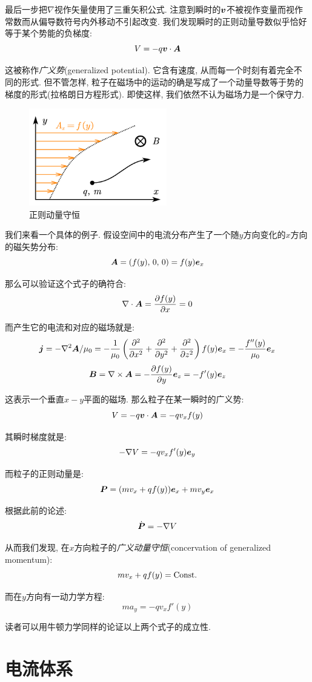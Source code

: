 最后一步把$\nabla$视作矢量使用了三重矢积公式. 注意到瞬时的$\boldsymbol{v}$不被视作变量而视作常数而从偏导数符号内外移动不引起改变. 我们发现瞬时的正则动量导数似乎恰好等于某个势能的负梯度:
\[V=-q\boldsymbol{v}\cdot\boldsymbol{A}\]

这被称作\emph{广义势}(generalized potential). 它含有速度, 从而每一个时刻有着完全不同的形式. 但不管怎样, 粒子在磁场中的运动的确是写成了一个动量导数等于势的梯度的形式(拉格朗日方程形式). 即使这样, 我们依然不认为磁场力是一个保守力.

\begin{figure}
\centering
\includegraphics[width=6cm]{image/7-4-9.png}
\caption{正则动量守恒}
\end{figure}
我们来看一个具体的例子. 假设空间中的电流分布产生了一个随$y$方向变化的$x$方向的磁矢势分布:
\[\boldsymbol{A}=(f(y),\,0,\,0)=f(y)\boldsymbol{e}_x\]

那么可以验证这个式子的确符合:
\[\nabla\cdot\boldsymbol{A}=\frac{\partial f(y)}{\partial x}=0\]

而产生它的电流和对应的磁场就是:
\[\boldsymbol{j}=-\nabla^2\boldsymbol{A}/\mu_0=-\frac{1}{\mu_0}\left(\frac{\partial^2}{\partial x^2}+\frac{\partial^2}{\partial y^2}+\frac{\partial^2}{\partial z^2}\right)f(y)\boldsymbol{e}_x=-\frac{f''(y)}{\mu_0}\boldsymbol{e}_x\]
\[\boldsymbol{B}=\nabla\times \boldsymbol{A}=-\frac{\partial f(y)}{\partial y}\boldsymbol{e}_z=-f'(y)\boldsymbol{e}_z\]

这表示一个垂直$x-y$平面的磁场. 那么粒子在某一瞬时的广义势:
\[V=-q\boldsymbol{v}\cdot\boldsymbol{A}=-qv_xf(y)\]

其瞬时梯度就是:
\[-\nabla V=-qv_xf'(y)\boldsymbol{e}_y\]

而粒子的正则动量是:
\[\boldsymbol{P}=(mv_x+qf(y))\boldsymbol{e}_x+mv_y\boldsymbol{e}_x\]

根据此前的论述:
\[\dot{\boldsymbol{P}}=-\nabla V\]

从而我们发现, 在$x$方向粒子的\emph{广义动量守恒}(concervation of generalized momentum):
\[mv_x+qf(y)={\rm Const.}\]

而在$y$方向有一动力学方程:
\[ma_y=-qv_xf'(y)\]

读者可以用牛顿力学同样的论证以上两个式子的成立性.


\section{电流体系}

